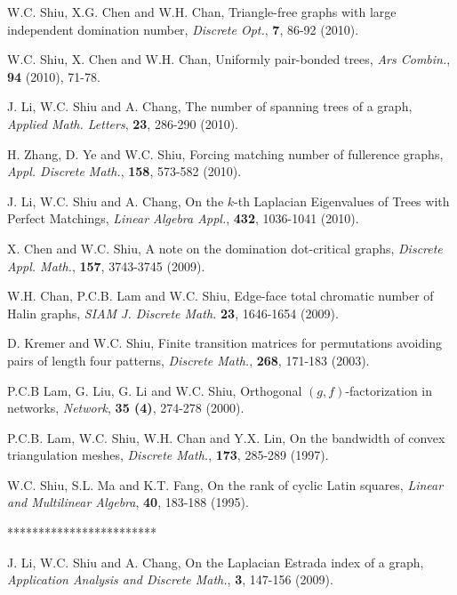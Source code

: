 \item W.C. Shiu, X.G. Chen and W.H. Chan, Triangle-free
graphs with large independent domination number, {\it
Discrete Opt.}, {\bf 7}, 86-92 (2010).

\item W.C. Shiu, X. Chen and W.H. Chan, Uniformly pair-bonded
trees, {\it Ars Combin.}, {\bf 94} (2010), 71-78.

\item J. Li, W.C. Shiu and A. Chang, The number of spanning trees
of a graph, {\it Applied Math. Letters}, {\bf 23}, 286-290
(2010).

\item H. Zhang, D. Ye and W.C. Shiu, Forcing matching
number of fullerence graphs, {\it Appl. Discrete Math.},
{\bf 158}, 573-582 (2010).

\item J. Li, W.C. Shiu and A. Chang, On the $k$-th Laplacian
Eigenvalues of Trees with Perfect Matchings, {\it Linear
Algebra Appl.}, {\bf 432}, 1036-1041 (2010).

\item X. Chen and W.C. Shiu, A note on the domination
dot-critical graphs, {\it Discrete Appl. Math.}, {\bf 157},
3743-3745 (2009).

\item W.H. Chan, P.C.B. Lam and W.C. Shiu, Edge-face
total chromatic number of Halin graphs, {\it SIAM J.
Discrete Math.} {\bf 23}, 1646-1654 (2009).

\item D. Kremer and W.C. Shiu, Finite transition matrices for permutations
avoiding pairs of length four patterns, {\it Discrete
Math.}, {\bf 268}, 171-183 (2003).

\item P.C.B Lam, G. Liu, G. Li and W.C. Shiu, Orthogonal $(g,f)$-factorization
in networks, {\it Network}, {\bf 35 (4)}, 274-278 (2000).

\item P.C.B. Lam, W.C. Shiu, W.H. Chan and Y.X. Lin, On the bandwidth of convex
triangulation meshes, {\it Discrete Math.}, {\bf 173},
285-289 (1997).

\item W.C. Shiu, S.L. Ma and K.T. Fang, On the rank of cyclic Latin squares,
{\it Linear and Multilinear Algebra}, {\bf 40}, 183-188
(1995).

************************
\item J. Li, W.C. Shiu and A. Chang, On the Laplacian Estrada index of a
graph, {\it Application Analysis and Discrete Math.}, {\bf
3}, 147-156 (2009).

